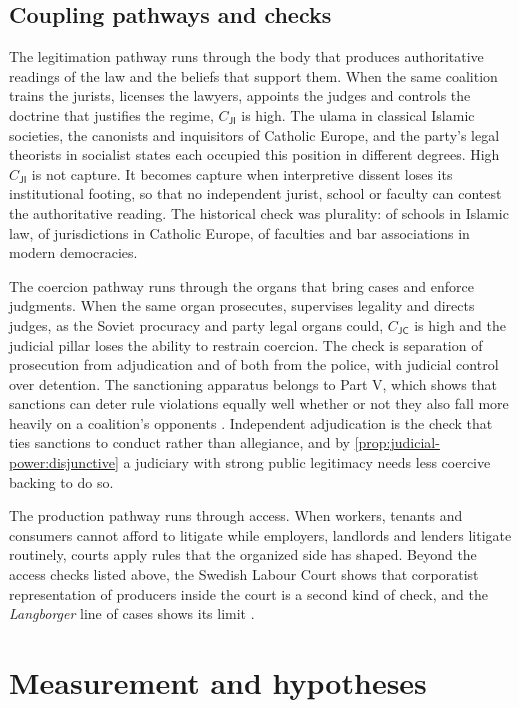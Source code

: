 \documentclass[11pt,letterpaper]{article}
\theoremstyle{definition}
\theoremstyle{remark}
\newcommand{\pJ}{\mathsf{J}}
\newcommand{\pI}{\mathsf{I}}
\newcommand{\pC}{\mathsf{C}}
\begin{document}
\subsection{Coupling pathways and checks}

The legitimation pathway runs through the body that produces authoritative readings of the law and the beliefs that support them. When the same coalition trains the jurists, licenses the lawyers, appoints the judges and controls the doctrine that justifies the regime, $C_{\pJ\pI}$ is high. The ulama in classical Islamic societies, the canonists and inquisitors of Catholic Europe, and the party's legal theorists in socialist states each occupied this position in different degrees. High $C_{\pJ\pI}$ is not capture. It becomes capture when interpretive dissent loses its institutional footing, so that no independent jurist, school or faculty can contest the authoritative reading. The historical check was plurality: of schools in Islamic law, of jurisdictions in Catholic Europe, of faculties and bar associations in modern democracies.

The coercion pathway runs through the organs that bring cases and enforce judgments. When the same organ prosecutes, supervises legality and directs judges, as the Soviet procuracy and party legal organs could, $C_{\pJ\pC}$ is high and the judicial pillar loses the ability to restrain coercion. The check is separation of prosecution from adjudication and of both from the police, with judicial control over detention. The sanctioning apparatus belongs to Part V, which shows that sanctions can deter rule violations equally well whether or not they also fall more heavily on a coalition's opponents \citep{long2026coercive}. Independent adjudication is the check that ties sanctions to conduct rather than allegiance, and by \cref{prop:judicial-power:disjunctive} a judiciary with strong public legitimacy needs less coercive backing to do so.

The production pathway runs through access. When workers, tenants and consumers cannot afford to litigate while employers, landlords and lenders litigate routinely, courts apply rules that the organized side has shaped. Beyond the access checks listed above, the Swedish Labour Court shows that corporatist representation of producers inside the court is a second kind of check, and the \emph{Langborger} line of cases shows its limit \citep{langborger1989,stallarholmens1990}.

\section{Measurement and hypotheses}
\label{sec:measurement}
\end{document}
